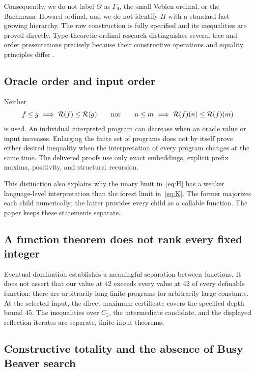 \documentclass[11pt,a4paper]{article}
\theoremstyle{definition}
\newcommand{\R}{\mathcal R}
\begin{document}
Consequently, we do not label \(\Theta\) as \(\Gamma_0\), the small Veblen
ordinal, or the Bachmann--Howard ordinal, and we do not identify \(H\) with a
standard fast-growing hierarchy. The raw construction is fully specified
and its inequalities are proved directly. Type-theoretic ordinal research
distinguishes several tree and order presentations precisely because their
constructive operations and equality principles differ \cite{ordinals}.

\subsection{Oracle order and input order}

Neither
\[
 f\le g\ \Longrightarrow\ \R(f)\le\R(g)
 \qquad\hbox{nor}\qquad
 n\le m\ \Longrightarrow\ \R(f)(n)\le\R(f)(m)
\]
is used. An individual interpreted program can decrease when an oracle
value or input increases. Enlarging the finite set of programs does not
by itself prove either desired inequality when the interpretation of every
program changes at the same time. The delivered proofs use only exact
embeddings, explicit prefix maxima, positivity, and structural recursion.

This distinction also explains why the unary limit in~\eqref{eq:H} has a
weaker language-level interpretation than the forest limit in~\eqref{eq:K}.
The former majorizes each child numerically; the latter provides every child
as a callable function. The paper keeps these statements separate.

\subsection{A function theorem does not rank every fixed integer}

Eventual domination establishes a meaningful separation between functions.
It does not assert that our value at 42 exceeds every value at 42 of every
definable function: there are arbitrarily long finite programs for arbitrarily
large constants. At the selected input, the direct maximum certificate
covers the specified depth bound 45. The inequalities over \(C_5\), the
intermediate candidate, and the displayed reflection iterates are separate,
finite-input theorems.

\subsection{Constructive totality and the absence of Busy Beaver search}
\end{document}
